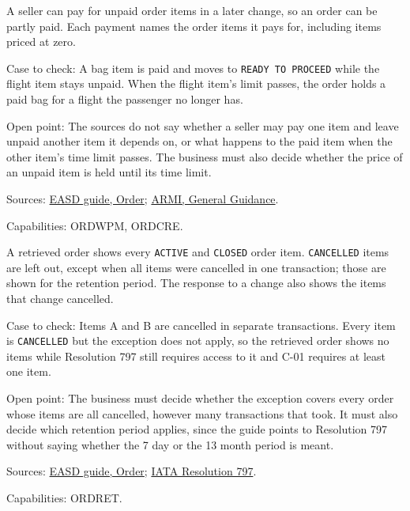 \begin{definition}
  \label{def:order-creation-pay-some-items}
  \notready
  A seller can pay for unpaid order items in a later change, so an order can
  be partly paid. Each payment names the order items it pays for, including
  items priced at zero.

  Case to check: A bag item is paid and moves to \texttt{READY TO PROCEED}
  while the flight item stays unpaid. When the flight item's limit passes,
  the order holds a paid bag for a flight the passenger no longer has.

  Open point: The sources do not say whether a seller may pay one item and
  leave unpaid another item it depends on, or what happens to the paid item
  when the other item's time limit passes. The business must also decide
  whether the price of an unpaid item is held until its time limit.

  Sources: \href{https://standards.atlassian.net/wiki/spaces/EASD/pages/574849062/Order}{EASD guide, Order};
  \href{https://standards.atlassian.net/wiki/spaces/ARMI/pages/584318980/General+Guidance}{ARMI, General Guidance}.

  Capabilities: ORDWPM, ORDCRE.
\end{definition}

\begin{definition}
  \label{def:order-creation-retrieved-view-items}
  \notready
  A retrieved order shows every \texttt{ACTIVE} and \texttt{CLOSED} order
  item. \texttt{CANCELLED} items are left out, except when all items were
  cancelled in one transaction; those are shown for the retention period.
  The response to a change also shows the items that change cancelled.

  Case to check: Items A and B are cancelled in separate transactions. Every
  item is \texttt{CANCELLED} but the exception does not apply, so the
  retrieved order shows no items while Resolution 797 still requires access
  to it and C-01 requires at least one item.

  Open point: The business must decide whether the exception covers every
  order whose items are all cancelled, however many transactions that took.
  It must also decide which retention period applies, since the guide points
  to Resolution 797 without saying whether the 7 day or the 13 month period
  is meant.

  Sources: \href{https://standards.atlassian.net/wiki/spaces/EASD/pages/574849062/Order}{EASD guide, Order};
  \href{https://www.iata.org/contentassets/72cbd60393ff42b5975d90ce9e049a7d/oneorder-resolution-797.pdf}{IATA Resolution 797}.

  Capabilities: ORDRET.
\end{definition}

